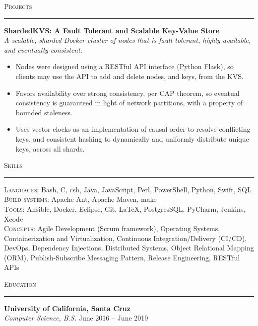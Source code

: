 \documentclass{res}
\begin{document}
\begin{resume}
\begin{itemize}
	\end{itemize}
\textsc{{\Large Projects}}
\vspace{0.5mm}
\hrule width18.5cm
\textbf{ShardedKVS: A Fault Tolerant and Scalable Key-Value Store}\\
\textit{A scalable, sharded Docker cluster of nodes that is fault tolerant, highly available, and eventually consistent.}
	\vspace{2mm}
	\begin{itemize}
    \item Nodes were designed using a RESTful API interface (Python Flask), so clients may use the API to add and delete nodes, and keys, from the KVS.
		\item Favors availability over strong consistency, per CAP theorem, so eventual consistency is guaranteed in light of network partitions, with a property of bounded staleness.
    \item Uses vector clocks as an implementation of causal order to resolve conflicting keys, and consistent hashing to dynamically and uniformly distribute unique keys, across all shards.
	\end{itemize}
\textsc{{\Large Skills}}
\vspace{0.5mm}
\hrule width18.5cm
\textsc{Languages:} Bash, C, csh, Java, JavaScript, Perl, PowerShell, Python, Swift, SQL\\[2mm]
\textsc{Build systems:} Apache Ant, Apache Maven, make\\[2mm]
\textsc{Tools:} Ansible, Docker, Eclipse, Git, \LaTeX, PostgresSQL, PyCharm, Jenkins, Xcode\\[2mm]
\textsc{Concepts:} Agile Development (Scrum framework), Operating Systems, Containerization and Virtualization, Continuous Integration/Delivery (CI/CD), DevOps, Dependency Injections, Distributed Systems, Object Relational Mapping (ORM), Publish-Subscribe Messaging Pattern, Release Engineering, RESTful APIs\\[0.5mm]
\vspace{-4mm}

\textsc{{\Large Education}}
\vspace{0.5mm}
\hrule width18.5cm
\textbf{University of California, Santa Cruz}\\
\textit{Computer Science, B.S.}
\hfill
June 2016 -- June 2019\\
\vspace{-2mm}
\end{resume}
\end{document}
